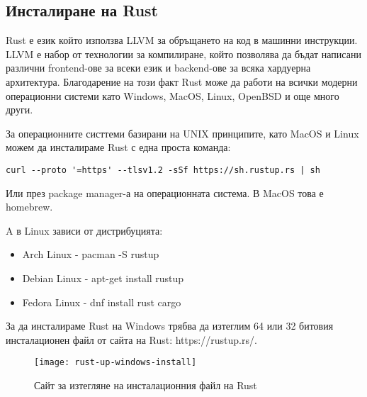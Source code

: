 \subsection{Инсталиране на Rust}
Rust е език който използва LLVM за обръщането на код в машинни инструкции.
LLVM е набор от технологии за компилиране, който позволява да бъдат написани
различни frontend-ове за всеки език и backend-ове за всяка хардуерна архитектура.
Благодарение на този факт Rust може да работи на всички модерни операционни системи
като Windows, MacOS, Linux, OpenBSD и още много други.

За операционните систтеми базирани на UNIX принципите, като MacOS и Linux можем
да инсталираме Rust с една проста команда:
\begin{lstlisting}
curl --proto '=https' --tlsv1.2 -sSf https://sh.rustup.rs | sh
\end{lstlisting}

Или през package manager-а на операционната система.
В MacOS това е homebrew.

A в Linux зависи от дистрибуцията:
\begin{itemize}
\item Arch Linux - pacman -S rustup
\item Debian Linux - apt-get install rustup
\item Fedora Linux - dnf install rust cargo
\end{itemize}

За да инсталираме Rust на Windows трябва да изтеглим 64 или 32 битовия
инсталационен файл от сайта на Rust: https://rustup.rs/. 

\begin{figure}[!htb]
  \texttt{[image: rust-up-windows-install]}
  \centering
  \caption{Сайт за изтегляне на инсталационния файл на Rust}
  \label{fig:rust-up-windows-install}
\end{figure}
